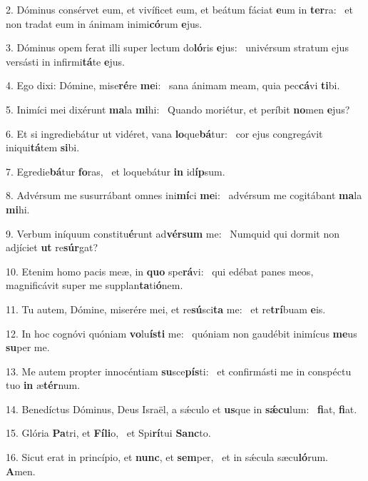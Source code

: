 2. Dóminus consérvet eum, et vivíficet eum, et beátum fáciat \textbf{e}um in \textbf{ter}ra: \ast\  et non tradat eum in ánimam inimi\textbf{có}rum \textbf{e}jus.\

3. Dóminus opem ferat illi super lectum do\textbf{ló}ris \textbf{e}jus: \ast\  univérsum stratum ejus versásti in infirmi\textbf{tá}te \textbf{e}jus.\

4. Ego dixi: Dómine, mise\textbf{ré}re \textbf{me}i: \ast\  sana ánimam meam, quia pec\textbf{cá}vi \textbf{ti}bi.\

5. Inimíci mei dixérunt \textbf{ma}la \textbf{mi}hi: \ast\  Quando moriétur, et períbit \textbf{no}men \textbf{e}jus?\

6. Et si ingrediebátur ut vidéret, vana \textbf{lo}que\textbf{bá}tur: \ast\  cor ejus congregávit iniqui\textbf{tá}tem \textbf{si}bi.\

7. Egredie\textbf{bá}tur \textbf{fo}ras, \ast\  et loquebátur \textbf{in} id\textbf{íp}sum.\

8. Advérsum me susurrábant omnes ini\textbf{mí}ci \textbf{me}i: \ast\  advérsum me cogitábant \textbf{ma}la \textbf{mi}hi.\

9. Verbum iníquum constitu\textbf{é}runt ad\textbf{vér}\textbf{sum} me: \ast\  Numquid qui dormit non adjíciet \textbf{ut} re\textbf{súr}gat?\

10. Etenim homo pacis meæ, in \textbf{quo} spe\textbf{rá}vi: \ast\  qui edébat panes meos, magnificávit super me supplan\textbf{ta}ti\textbf{ó}nem.\

11. Tu autem, Dómine, miserére mei, et re\textbf{sú}sci\textbf{ta} me: \ast\  et re\textbf{trí}buam \textbf{e}is.\

12. In hoc cognóvi quóniam \textbf{vo}lu\textbf{ís}\textbf{ti} me: \ast\  quóniam non gaudébit inimícus \textbf{me}us \textbf{su}per me.\

13. Me autem propter innocéntiam \textbf{su}sce\textbf{pís}ti: \ast\  et confirmásti me in conspéctu tuo \textbf{in} æ\textbf{tér}num.\

14. Benedíctus Dóminus, Deus Israël, a sǽculo et \textbf{us}que in \textbf{sǽ}\textbf{cu}lum: \ast\  \textbf{fi}at, \textbf{fi}at.\

15. Glória \textbf{Pa}tri, et \textbf{Fí}\textbf{li}o, \ast\  et Spi\textbf{rí}tui \textbf{Sanc}to.\

16. Sicut erat in princípio, et \textbf{nunc}, et \textbf{sem}per, \ast\  et in sǽcula sæcu\textbf{ló}rum. \textbf{A}men.\

